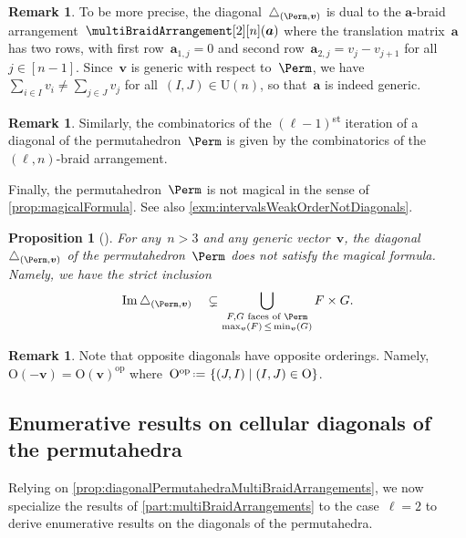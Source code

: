 \documentclass{amsart}
\newtheorem{proposition}[theorem]{Proposition}
\theoremstyle{definition}
\newtheorem{remark}[theorem]{Remark}
\renewcommand{\b}[1]{{\boldsymbol{#1}}} %
\newcommand{\Un}{\mathrm{U}} %
\newcommand{\Or}{\mathrm{O}} %
\newcommand{\set}[2]{\left\{ #1 \;\middle|\; #2 \right\}} %
\newcommand{\eqdef}{\mbox{\,\raisebox{0.2ex}{\scriptsize\ensuremath{\mathrm:}}\ensuremath{=}\,}} %
\DeclareMathOperator{\Ima}{Im} %
\newcommand{\ordinalst}{\textsuperscript{st}} %
\renewcommand{\b}[1]{\boldsymbol{#1}} %
\newcommand{\op}{\mathrm{op}}
\begin{document}
\begin{remark}
\label{rem:translationMatrix}
To be more precise, the diagonal~$\triangle_{(\Perm, \b{v})}$ is dual to the $\b{a}$-braid arrangement~$\multiBraidArrangement[2][n](\b{a})$ where the translation matrix~$\b{a}$ has two rows, with first row~${\b{a}_{1,j} = 0}$ and second row~$\b{a}_{2,j} = v_j-v_{j+1}$ for all~$j \in [n-1]$.
Since~$\b{v}$ is generic with respect to~$\Perm$, we have~$\sum_{i \in I} v_i \ne \sum_{j \in J} v_j$ for all~$(I,J) \in \Un(n)$, so that~$\b{a}$ is indeed generic.
\end{remark}

\begin{remark}
Similarly, the combinatorics of the $(\ell-1)$\ordinalst{} iteration of a diagonal of the permutahedron~$\Perm$ is given by the combinatorics of the $(\ell,n)$-braid arrangement.
\end{remark}

Finally, the permutahedron~$\Perm$ is not magical in the sense of \cref{prop:magicalFormula}.
See also \cref{exm:intervalsWeakOrderNotDiagonals}.

\begin{proposition}[{\cite[Sect.~3]{LaplanteAnfossi}}]
For any~$n > 3$ and any generic vector~$\b{v}$, the diagonal~$\triangle_{(\Perm, \b{v})}$ of the permutahedron~$\Perm$ does \emph{not} satisfy the magical formula.
Namely, we have the strict inclusion	  
\begin{equation*}
\Ima\triangle_{(\Perm, \b{v})} \quad \subsetneq \bigcup_{\substack{F,G \text{ faces of } \Perm \\ \max_{\b{v}}(F) \, \le \, \min_{\b{v}}(G)}} F \times G .
\end{equation*}
\end{proposition}

\begin{remark}
\label{rem:oppositeDiagonals}
Note that opposite diagonals have opposite orderings.
Namely, $\Or(-\b{v}) = \Or(\b{v})^{\op}$ where~$\Or^{\op} \eqdef \set{(J,I)}{(I,J) \in \Or}$.
\end{remark}


\subsection{Enumerative results on cellular diagonals of the permutahedra} 
\label{subsec:enumerationDiagonalPermutahedra}

Relying on \cref{prop:diagonalPermutahedraMultiBraidArrangements}, we now specialize the results of \cref{part:multiBraidArrangements} to the case~$\ell = 2$ to derive enumerative results on the diagonals of the permutahedra.
\end{document}
